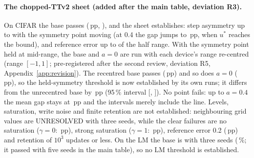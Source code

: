 \paragraph{The chopped-TTv2 sheet (added after the main table, deviation R3).} On CIFAR the base passes
(\RVSpecCttvTwoCifarBaseGap\,pp, \RVSpecCttvTwoCifarBaseLabel), and the sheet establishes: step asymmetry up to
\RVSpecCttvTwoCifarAsymThr{} with the symmetry point moving (at 0.4 the gap jumps to \RVSpecCttvTwoCifarAsymAtZeroPFourGap\,pp,
when $u^*$ reaches the bound), and reference error up to \RVSpecCttvTwoCifarRefErrThr{} of the half range. With the symmetry point
held at mid-range, the base and $a=0$ are run with each device's range re-centred (range $[-1, 1]$; pre-registered after the
second review, deviation R5, Appendix~\ref{app:revision}). The recentred base passes (\RVSpecCttvTwoCifarAsymFixedspAtZeroPZeroFiveGap\,pp) and so does $a=0$
(\RVSpecCttvTwoCifarAsymFixedspAtZeroPZeroGap\,pp), so the held-symmetry threshold \RVSpecCttvTwoCifarAsymFixedspThr{} is now
established by its own runs; it differs from the unrecentred base by \RXFixCttvTwoCifarRmu\,pp (95\,\% interval
[\RXFixCttvTwoCifarRmuLo, \RXFixCttvTwoCifarRmuHi]). No point fails: up to $a=0.4$ the mean gap stays at
\RVSpecCttvTwoCifarAsymFixedspAtZeroPFourGap\,pp and the intervals merely include the line. Levels,
saturation, write noise and finite retention are not established: neighbouring grid values are UNRESOLVED with three seeds,
while the clear failures are no saturation ($\gamma=0$: \RVSpecCttvTwoCifarGammaAtZeroPZeroGap\,pp), strong saturation
($\gamma=1$: \RVSpecCttvTwoCifarGammaAtOnePZeroGap\,pp), reference error 0.2 (\RVSpecCttvTwoCifarRefErrAtZeroPTwoGap\,pp) and
retention of $10^3$ updates or less. On the LM the base is \RVSpecCttvTwoLmBaseLabel{} with three seeds
(\RVSpecCttvTwoLmBaseGap\,\%; it passed with five seeds in the main table), so no LM threshold is established.

